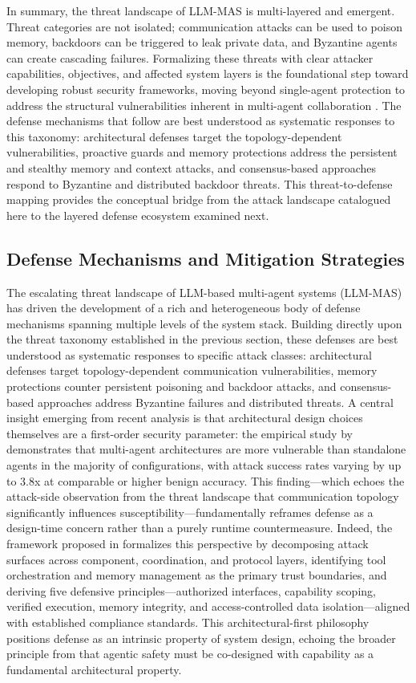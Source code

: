 \documentclass[11pt]{article}
\begin{document}
In summary, the threat landscape of LLM-MAS is multi-layered and emergent. Threat categories are not isolated; communication attacks can be used to poison memory, backdoors can be triggered to leak private data, and Byzantine agents can create cascading failures. Formalizing these threats with clear attacker capabilities, objectives, and affected system layers is the foundational step toward developing robust security frameworks, moving beyond single-agent protection to address the structural vulnerabilities inherent in multi-agent collaboration \cite{ref407,ref418}. The defense mechanisms that follow are best understood as systematic responses to this taxonomy: architectural defenses target the topology-dependent vulnerabilities, proactive guards and memory protections address the persistent and stealthy memory and context attacks, and consensus-based approaches respond to Byzantine and distributed backdoor threats. This threat-to-defense mapping provides the conceptual bridge from the attack landscape catalogued here to the layered defense ecosystem examined next.

\subsection{Defense Mechanisms and Mitigation Strategies}

The escalating threat landscape of LLM-based multi-agent systems (LLM-MAS) has driven the development of a rich and heterogeneous body of defense mechanisms spanning multiple levels of the system stack. Building directly upon the threat taxonomy established in the previous section, these defenses are best understood as systematic responses to specific attack classes: architectural defenses target topology-dependent communication vulnerabilities, memory protections counter persistent poisoning and backdoor attacks, and consensus-based approaches address Byzantine failures and distributed threats. A central insight emerging from recent analysis is that architectural design choices themselves are a first-order security parameter: the empirical study by \cite{ref412} demonstrates that multi-agent architectures are more vulnerable than standalone agents in the majority of configurations, with attack success rates varying by up to 3.8x at comparable or higher benign accuracy. This finding---which echoes the attack-side observation from the threat landscape that communication topology significantly influences susceptibility---fundamentally reframes defense as a design-time concern rather than a purely runtime countermeasure. Indeed, the framework proposed in \cite{ref422} formalizes this perspective by decomposing attack surfaces across component, coordination, and protocol layers, identifying tool orchestration and memory management as the primary trust boundaries, and deriving five defensive principles---authorized interfaces, capability scoping, verified execution, memory integrity, and access-controlled data isolation---aligned with established compliance standards. This architectural-first philosophy positions defense as an intrinsic property of system design, echoing the broader principle from \cite{ref418} that agentic safety must be co-designed with capability as a fundamental architectural property.
\end{document}
